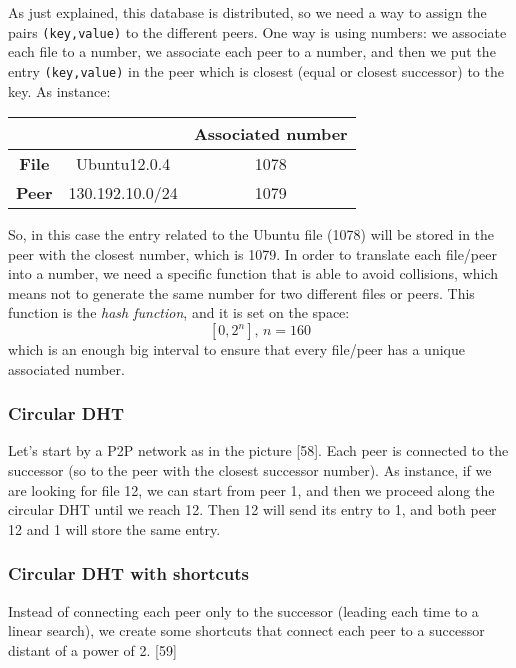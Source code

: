 As just explained, this database is distributed, so we need a way to assign the pairs \texttt{(key,value)} to the different peers. One way is using numbers: we associate each file to a number, we associate each peer to a number, and then we put the entry \texttt{(key,value)} in the peer which is closest (equal or closest successor) to the key. As instance:
\begin{table}[h!]
    \centering
    \begin{tabular}{cc|c|}
    \cline{3-3}
    \multicolumn{1}{l}{} & \multicolumn{1}{l|}{} & \multicolumn{1}{l|}{Associated number} \\ \hline
    \multicolumn{1}{|c|}{\textbf{File}} & Ubuntu12.0.4 & 1078 \\ \hline
    \multicolumn{1}{|c|}{\textbf{Peer}} & 130.192.10.0/24 & 1079 \\ \hline
    \end{tabular}
\end{table}

\noindent So, in this case the entry related to the Ubuntu file (1078) will be stored in the peer with the closest number, which is 1079. In order to translate each file/peer into a number, we need a specific function that is able to avoid collisions, which means not to generate the same number for two different files or peers. This function is the \textit{hash function}, and it is set on the space:
\[[0,2^n]\text{, }n=160\]
\noindent which is an enough big interval to ensure that every file/peer has a unique associated number.

\subsubsection{Circular DHT}
Let's start by a P2P network as in the picture [58]. Each peer is connected to the successor (so to the peer with the closest successor number). As instance, if we are looking for file 12, we can start from peer 1, and then we proceed along the circular DHT until we reach 12. Then 12 will send its entry to 1, and both peer 12 and 1 will store the same entry.

\subsubsection{Circular DHT with shortcuts}
Instead of connecting each peer only to the successor (leading each time to a linear search), we create some shortcuts that connect each peer to a successor distant of a power of 2. [59]

